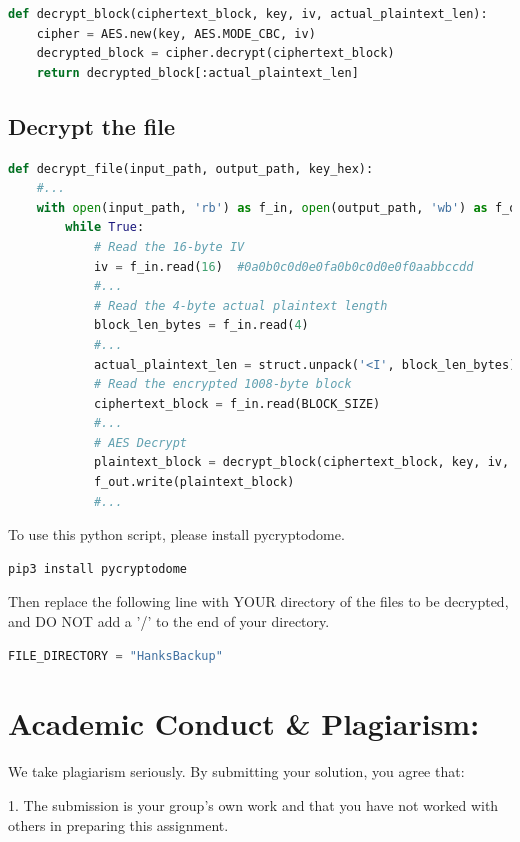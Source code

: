 \documentclass[11pt]{article}
\begin{document}
\begin{lstlisting}[language=python, caption=decrypt\_block]
def decrypt_block(ciphertext_block, key, iv, actual_plaintext_len):
    cipher = AES.new(key, AES.MODE_CBC, iv)
    decrypted_block = cipher.decrypt(ciphertext_block)
    return decrypted_block[:actual_plaintext_len]
\end{lstlisting}

\subsection{Decrypt the file}

\begin{lstlisting}[language=python, caption=decrypt\_file]
def decrypt_file(input_path, output_path, key_hex):
    #...
    with open(input_path, 'rb') as f_in, open(output_path, 'wb') as f_out:
        while True:
            # Read the 16-byte IV
            iv = f_in.read(16)  #0a0b0c0d0e0fa0b0c0d0e0f0aabbccdd
            #...
            # Read the 4-byte actual plaintext length
            block_len_bytes = f_in.read(4)
            #...
            actual_plaintext_len = struct.unpack('<I', block_len_bytes)[0]
            # Read the encrypted 1008-byte block
            ciphertext_block = f_in.read(BLOCK_SIZE)
            #...
            # AES Decrypt
            plaintext_block = decrypt_block(ciphertext_block, key, iv, actual_plaintext_len)
            f_out.write(plaintext_block)
            #...
\end{lstlisting}

To use this python script, please install pycryptodome.
\begin{lstlisting}
pip3 install pycryptodome
\end{lstlisting}

Then replace the following line with YOUR directory of the files to be decrypted, and DO NOT add a '/' to the end of your directory.
\begin{lstlisting}[language=python]
FILE_DIRECTORY = "HanksBackup"
\end{lstlisting}


\section*{Academic Conduct \& Plagiarism:}
We take plagiarism seriously. By submitting your solution, you agree that:

1. The submission is your group's own work and that you have not worked with others in preparing this assignment.
\end{document}
